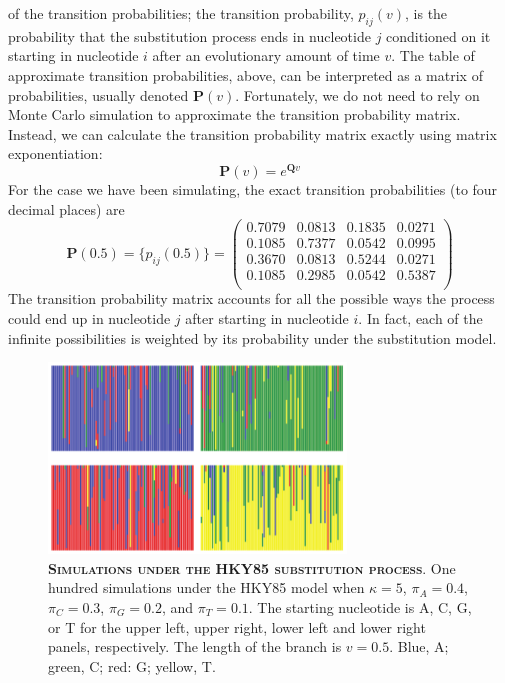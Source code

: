 \documentclass{svmult}
\begin{document}
of the transition probabilities; the transition probability, $p_{ij}(v)$, is the probability that the substitution process ends in nucleotide
$j$ conditioned on it starting in nucleotide $i$ after an evolutionary amount of time $v$. The table of approximate transition probabilities,
above, can be interpreted as a matrix of probabilities, usually denoted ${\mathbf P}(v)$. 
Fortunately, we do not need to rely on Monte Carlo simulation to approximate the transition probability matrix. Instead, we can
calculate the transition probability matrix exactly using matrix exponentiation:
$$
{\mathbf P}(v) = e^{{\mathbf Q} v}
$$
For the case we have been simulating, the exact transition probabilities (to four decimal places) are
$$
{\mathbf P}(0.5) = \{p_{ij}(0.5)\} = \left( \begin{array}{rrrr}
0.7079 & 0.0813 & 0.1835 & 0.0271 \\
0.1085 & 0.7377 & 0.0542 & 0.0995 \\
0.3670 & 0.0813 & 0.5244 & 0.0271 \\
0.1085 & 0.2985 & 0.0542 & 0.5387 \\
\end{array} \right)
$$
The transition probability matrix accounts for all the possible ways the process could end up in nucleotide
$j$ after starting in nucleotide $i$. In fact, each of the infinite possibilities is weighted by its probability
under the substitution model.

\begin{figure}[t]
\centering
\includegraphics[height=2in]{fig4}
\caption{\textbf{\textsc{Simulations under the HKY85 substitution process}}.
One hundred simulations under the HKY85 model when 
$\kappa = 5$, $\pi_A = 0.4$, $\pi_C = 0.3$, $\pi_G = 0.2$, and $\pi_T = 0.1$. The starting nucleotide is
A, C, G, or T for the upper left, upper right, lower left and lower right panels, respectively. The length of the branch
is $v = 0.5$. Blue, A; green, C; red: G; yellow, T. 
}
\label{fig4}
\end{figure}
\end{document}

